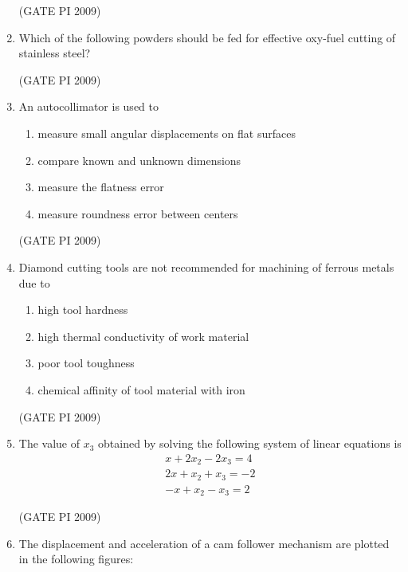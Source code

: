 \documentclass[journal,12pt,onecolumn]{IEEEtran}
\theoremstyle{remark}
\begin{document}
\begin{enumerate}
\begin{enumerate}
\end{enumerate}
\hfill (GATE PI 2009)
\item Which of the following powders should be fed for effective oxy-fuel cutting of stainless steel?
\begin{enumerate}
\end{enumerate}
\hfill (GATE PI 2009)
\item An autocollimator is used to

\begin{enumerate}
\item measure small angular displacements on flat surfaces
\item compare known and unknown dimensions
\item measure the flatness error
\item measure roundness error between centers
\end{enumerate}
\hfill (GATE PI 2009)
\item Diamond cutting tools are not recommended for machining of ferrous metals due to

\begin{enumerate}
\item high tool hardness
\item high thermal conductivity of work material
\item poor tool toughness
\item chemical affinity of tool material with iron
\end{enumerate}
\hfill (GATE PI 2009)
\item The value of $x_3$ obtained by solving the following system of linear equations is
\begin{align*} 
x + 2x_2 - 2x_3 = 4 \\ 
2x + x_2 + x_3 = -2 \\
-x + x_2 - x_3 = 2
\end{align*}
\begin{enumerate}
\end{enumerate}
\hfill (GATE PI 2009)
\item The displacement and acceleration of a cam follower mechanism are plotted in the following figures:


\end{enumerate}
\end{document}
